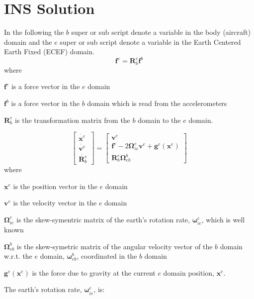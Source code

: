 \documentclass[a4paper]{report}
\numberwithin{equation}{chapter}
\newcommand{\mat}[1]{\boldsymbol{#1}}
\begin{document}
\section[INS Solution]{INS Solution}

In the following the $b$ super or sub script denote a variable in the body (aircraft) domain and the $e$ super or sub script denote a variable in the Earth Centered Earth Fixed (ECEF) domain.
\begin{equation}
\mat{f}^e = \mat{R}^e_b \mat{f}^b
\label{eqn:BodytoECEFForce}
\end{equation}
where

  $\mat{f}^e$ is a force vector in the $e$ domain

  $\mat{f}^b$ is a force vector in the $b$ domain which is read from the accelerometers

  $\mat{R}^e_b$ is the transformation matrix from the $b$ domain to the $e$ domain.

\begin{equation}
\begin{bmatrix}
\dot{\mat{x}^e}\\
\dot{\mat{v}^e}\\
\dot{\mat{R}^e_b}
\end{bmatrix}
=
\begin{bmatrix}
\mat{v}^e\\
\mat{f}^e - 2\mat{\Omega}^e_{ie} \mat{v}^e + \mat{g}^e \left( \mat{x}^e \right)\\
\mat{R}^e_b \mat{\Omega}^b_{eb}
\end{bmatrix}
\label{eqn:dynamic}
\end{equation}
where

  $\mat{x}^e$ is the position vector in the $e$ domain

  $\mat{v}^e$ is the velocity vector in the $e$ domain

  $\mat{\Omega}^e_{ie}$ is the skew-symentric matrix of the earth's rotation rate, $\mat{\omega}^e_{ie}$, which is well known

  $\mat{\Omega}^b_{eb}$ is the skew-symetric matrix of the angular velocity vector of the $b$ domain w.r.t. the $e$ domain, $\mat{\omega}^b_{eb}$, coordinated in the $b$ domain

  $\mat{g}^e \left( \mat{x}^e \right)$ is the force due to gravity at the current $e$ domain position, $\mat{x}^e$.

\bigskip

The earth's rotation rate, $\mat{\omega}^e_{ie}$, is:
\end{document}
